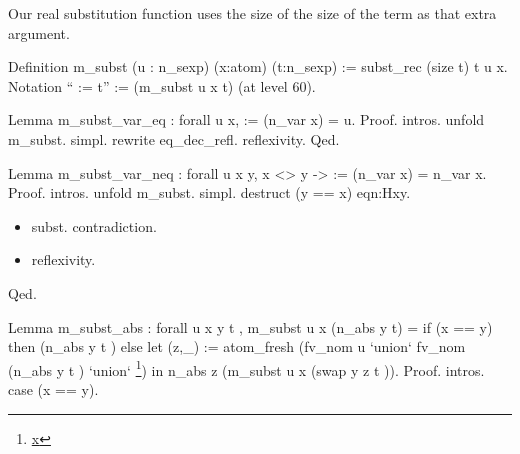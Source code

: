  Our real substitution function uses the size of the size of the term
    as that extra argument. 


Definition m\_subst (u : n\_sexp) (x:atom) (t:n\_sexp) :=
  subst\_rec (size t) t u x.
Notation ``  :=   t'' := (m\_subst u x t) (at level 60). 


Lemma m\_subst\_var\_eq : forall u x,
     := (n\_var x) = u.
Proof.
  intros. unfold m\_subst. simpl. rewrite eq\_dec\_refl. reflexivity.
Qed. 


Lemma m\_subst\_var\_neq : forall u x y, x <> y ->
     := (n\_var x) = n\_var x.
Proof.
  intros. unfold m\_subst. simpl. destruct (y == x) eqn:Hxy.

\begin{itemize}
\item  subst. contradiction.

\item  reflexivity.

\end{itemize}
Qed. 


Lemma m\_subst\_abs : forall u x y t , m\_subst u x (n\_abs y t)  =
       if (x == y) then (n\_abs y t )
       else let (z,\_) := atom\_fresh (fv\_nom u `union` fv\_nom (n\_abs y t ) `union` \footnote{\url{x}}) in
       n\_abs z (m\_subst u x (swap y z t )).
Proof.
  intros. case (x == y).

